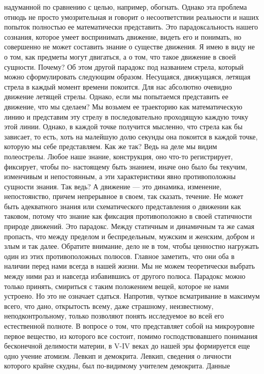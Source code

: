 надуманной по сравнению с целью, например, обогнать. Однако эта проблема отнюдь
не просто умозрительная и говорит о несоответствии реальности и наших попыток
полностью ее математически представить. Это парадоксальность нашего сознания,
которое умеет воспринимать движение, видеть его и понимать, но совершенно не
может составить знание о существе движения. Я имею в виду не о том, как предметы
могут двигаться, а о том, что такое движение в своей сущности. Почему? Об этом
другой парадокс под названием стрела, который можно сформулировать следующим
образом. Несущаяся, движущаяся, летящая стрела в каждый момент времени покоится.
Для нас абсолютно очевидно движение летящей стрелы. Однако, если мы попытаемся
представить ее движение, что мы сделаем? Мы возьмем ее траекторию как
математическую линию и представим эту стрелу в последовательно проходящую каждую
точку этой линии. Однако, в каждой точке получится мысленно, что стрела как бы
зависает, то есть, хоть на малейшую долю секунды она покоится в каждой точке,
которую мы себе представляем. Как же так? Ведь на деле мы видим полеострелы.
Любое наше знание, конструкция, оно что-то регистрирует, фиксирует, чтобы по-
настоящему быть знанием, иначе оно было бы текучим, изменчивым и непостоянным, а
эти характеристики явно противоположны сущности знания. Так ведь? А движение —
это динамика, изменение, непостоянство, причем непрерывное в своем, так сказать,
течение. Не может быть адекватного знания или схематического представления о
движении как таковом, потому что знание как фиксация противоположно в своей
статичности природе движений. Это парадокс. Между статичным и динамичным та же
самая пропасть, что между пределом и беспредельным, мужским и женским, добром и
злым и так далее. Обратите внимание, дело не в том, чтобы ценностно нагружать
один из этих противоположных полюсов. Главное заметить, что они оба в наличии
перед нами всегда в нашей жизни. Мы не можем теоретически выбрать между ними раз
и навсегда избавившись от другого полюса. Парадокс можно только принять,
смириться с таким положением вещей, которое не нами устроено. Но это не означает
сдаться. Напротив, чуткое всматривание в максимум всего, что дано, открытость
всему, даже страшному, неизвестному, неподконтрольному, только позволяют понять
исследуемое во всей его естественной полноте. В вопросе о том, что представляет
собой на микроуровне первое вещество, из которого все состоит, помимо
господствовавшего понимания бесконечной делимости материи, в V-IV веках до нашей
эры формируется еще одно учение атомизм. Левкип и демокрита. Левкип, сведения о
личности которого крайне скудны, был по-видимому учителем демокрита. Данные
